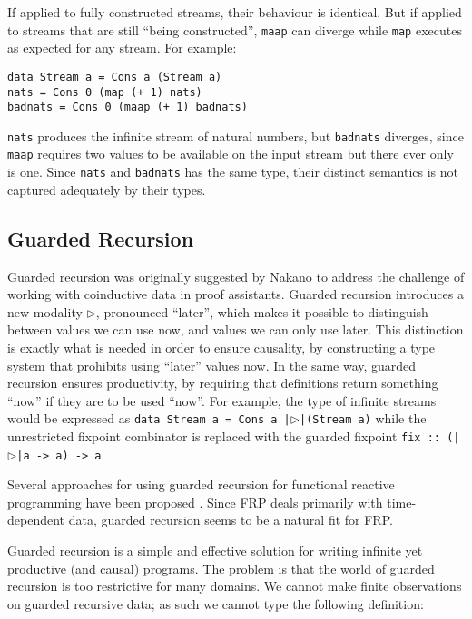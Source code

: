 \documentclass[sigplan,9pt,review]{acmart}\settopmatter{printfolios=true,printccs=false,printacmref=false}
\newcommand{\code}[1]{\texttt{#1}}
\begin{document}
If applied to fully constructed streams, their behaviour is identical. But if applied to
streams that are still ``being constructed'', \code{maap} can diverge while \code{map} executes as expected for any stream. For example:

\begin{verbatim}
data Stream a = Cons a (Stream a)
nats = Cons 0 (map (+ 1) nats)
badnats = Cons 0 (maap (+ 1) badnats)
\end{verbatim}

\code{nats} produces the infinite stream of natural numbers, but \code{badnats} diverges,
since \code{maap} requires two values to be available on the input stream but there ever
only is one. Since \code{nats} and \code{badnats} has the same type, their distinct
semantics is not captured adequately by their types.

\subsection{Guarded Recursion}\label{sec:guarded-recursion}
Guarded recursion was originally suggested by Nakano \cite{nakano2000modality}
to address the challenge of working with coinductive data in proof assistants.
Guarded recursion introduces a new modality $\rhd$, pronounced ``later'',
which makes it possible to distinguish between values we can use now, and
values we can only use later.
This distinction is exactly what is needed in order to ensure
causality, by constructing a type system that prohibits using ``later'' values
now. In the same way, guarded recursion ensures productivity, by requiring that
definitions return something ``now'' if they are to be used ``now''.
For example, the type of infinite streams would be expressed as \newline
\texttt
{data Stream a = Cons a |$\rhd$|(Stream a)} while the unrestricted fixpoint combinator
is replaced with the guarded fixpoint
\texttt{fix :: (|$\rhd$|a -> a) -> a}.

Several approaches for using guarded recursion for functional reactive programming have been
proposed \cite{krishnaswami2011ultrametric,cave2014fair,simple-frp}. Since FRP deals primarily
with time-dependent data, guarded recursion seems to be a natural fit for FRP.

Guarded recursion is a simple and effective solution for writing infinite yet productive (and causal)
programs. The problem is that the world of guarded recursion is too restrictive for many domains.
We cannot make finite observations on guarded recursive data; as such we cannot type the following
definition:
\end{document}
